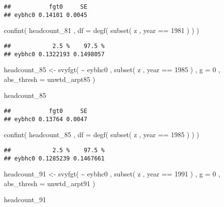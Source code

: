 \documentclass[
]{book}
\newenvironment{Shaded}{\begin{snugshade}}{\end{snugshade}}
\newcommand{\AttributeTok}[1]{\textcolor[rgb]{0.77,0.63,0.00}{#1}}
\newcommand{\DecValTok}[1]{\textcolor[rgb]{0.00,0.00,0.81}{#1}}
\newcommand{\FunctionTok}[1]{\textcolor[rgb]{0.00,0.00,0.00}{#1}}
\newcommand{\NormalTok}[1]{#1}
\newcommand{\OtherTok}[1]{\textcolor[rgb]{0.56,0.35,0.01}{#1}}
\newcommand{\SpecialCharTok}[1]{\textcolor[rgb]{0.00,0.00,0.00}{#1}}
\begin{document}
\begin{verbatim}
##           fgt0     SE
## eybhc0 0.14101 0.0045
\end{verbatim}

\begin{Shaded}
\begin{Highlighting}[]
\FunctionTok{confint}\NormalTok{( headcount\_81 , }\AttributeTok{df =} \FunctionTok{degf}\NormalTok{( }\FunctionTok{subset}\NormalTok{( z , year }\SpecialCharTok{==} \DecValTok{1981}\NormalTok{ ) ) )}
\end{Highlighting}
\end{Shaded}

\begin{verbatim}
##            2.5 %    97.5 %
## eybhc0 0.1322193 0.1498057
\end{verbatim}

\begin{Shaded}
\begin{Highlighting}[]
\NormalTok{headcount\_85 }\OtherTok{\textless{}{-}} 
    \FunctionTok{svyfgt}\NormalTok{( }
        \SpecialCharTok{\textasciitilde{}}\NormalTok{ eybhc0 , }
        \FunctionTok{subset}\NormalTok{( z , year }\SpecialCharTok{==} \DecValTok{1985}\NormalTok{ ) , }
        \AttributeTok{g =} \DecValTok{0}\NormalTok{ , }
        \AttributeTok{abs\_thresh =}\NormalTok{ unwtd\_arpt85 }
\NormalTok{    )}
    
\NormalTok{headcount\_85}
\end{Highlighting}
\end{Shaded}

\begin{verbatim}
##           fgt0     SE
## eybhc0 0.13764 0.0047
\end{verbatim}

\begin{Shaded}
\begin{Highlighting}[]
\FunctionTok{confint}\NormalTok{( headcount\_85 , }\AttributeTok{df =} \FunctionTok{degf}\NormalTok{( }\FunctionTok{subset}\NormalTok{( z , year }\SpecialCharTok{==} \DecValTok{1985}\NormalTok{ ) ) )}
\end{Highlighting}
\end{Shaded}

\begin{verbatim}
##            2.5 %    97.5 %
## eybhc0 0.1285239 0.1467661
\end{verbatim}

\begin{Shaded}
\begin{Highlighting}[]
\NormalTok{headcount\_91 }\OtherTok{\textless{}{-}} 
    \FunctionTok{svyfgt}\NormalTok{( }
        \SpecialCharTok{\textasciitilde{}}\NormalTok{ eybhc0 , }
        \FunctionTok{subset}\NormalTok{( z , year }\SpecialCharTok{==} \DecValTok{1991}\NormalTok{ ) , }
        \AttributeTok{g =} \DecValTok{0}\NormalTok{ , }
        \AttributeTok{abs\_thresh =}\NormalTok{ unwtd\_arpt91 }
\NormalTok{    )}

\NormalTok{headcount\_91}
\end{Highlighting}
\end{Shaded}
\end{document}
